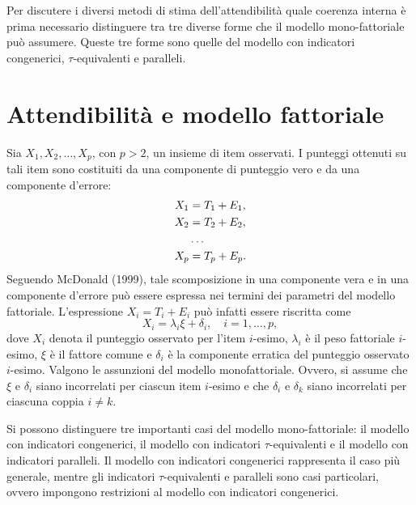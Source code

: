 Per discutere i diversi metodi di stima dell'attendibilità  quale coerenza interna è prima necessario distinguere tra tre diverse forme che il modello mono-fattoriale può assumere. Queste tre forme sono quelle del modello con indicatori congenerici, $\tau$-equivalenti e paralleli.

\section{Attendibilità e modello fattoriale}

%
Sia $X_1, X_2, \dots, X_p$, con $p>2$, un insieme di item osservati. 
  I  punteggi ottenuti su tali item sono costituiti da una componente di punteggio vero e da una componente d'errore: 
  \begin{align}
X_1 &=T_1+E_1,\notag\\ 
X_2 &=T_2+E_2,\notag\\ 
&\dots\notag\\ 
X_p &=T_p+E_p.\notag
\end{align}
Seguendo McDonald (1999), tale scomposizione in una componente vera e in una componente d'errore può essere espressa nei termini dei parametri del modello fattoriale.
  L'espressione $X_i = T_i + E_i$ può infatti essere riscritta come 
$$
X_i = \lambda_i \xi + \delta_i, \quad{i=1, \dots, p},
$$
dove $X_i$ denota il punteggio osservato per l'item $i$-esimo,
$\lambda_i$ è il peso fattoriale $i$-esimo, $\xi$ è il fattore comune e $\delta_i$ è la
componente erratica del punteggio osservato $i$-esimo. 
Valgono le assunzioni del modello monofattoriale.
 Ovvero, si assume che $\xi$ e
$\delta_i$ siano incorrelati per ciascun item $i$-esimo e che $\delta_i$ e
$\delta_k$ siano incorrelati per ciascuna coppia $i \neq k$.

Si possono distinguere tre importanti casi del modello mono-fattoriale: 
il modello con indicatori congenerici, il modello con indicatori  $\tau$-equivalenti e  il modello con indicatori paralleli. 
Il modello con indicatori congenerici rappresenta   il caso più
  generale, mentre gli indicatori $\tau$-equivalenti e
  paralleli sono casi particolari, ovvero impongono restrizioni al
  modello  con indicatori congenerici.

